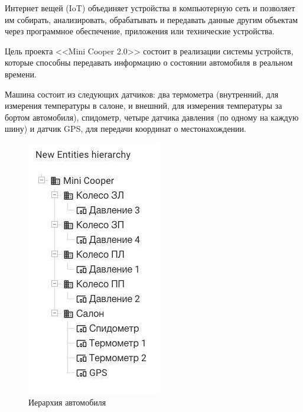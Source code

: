 
    Интернет вещей (IoT) объединяет устройства в компьютерную сеть и позволяет им собирать, анализировать, обрабатывать и передавать данные другим объектам через программное обеспечение, приложения или технические устройства.

    
    Цель проекта <<Mini Cooper 2.0>> состоит в реализации системы устройств, которые способны передавать информацию о состоянии автомобиля в реальном времени.
    
    Машина состоит из следующих датчиков: два термометра (внутренний, для измерения температуры в салоне, и внешний, для измерения температуры за бортом автомобиля), спидометр, четыре датчика давления (по одному на каждую шину) и датчик GPS, для передачи координат о местонахождении.
    
    
    \begin{figure}[!ht]
		\centering
		\includegraphics[scale=0.8]{pictures/5.jpg}
		\caption{Иерархия автомобиля}
		\label{fig1}
	\end{figure}